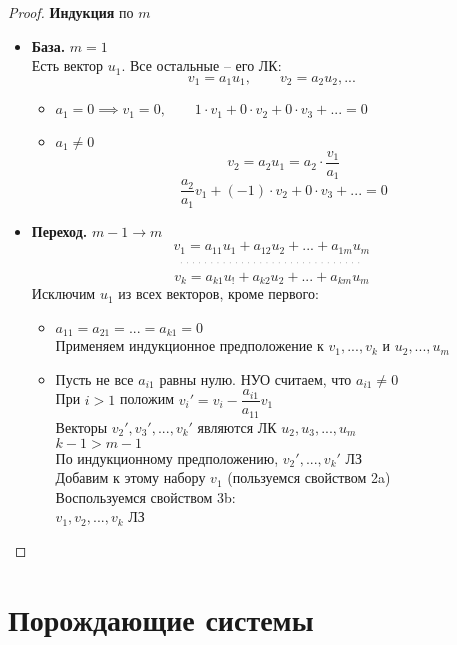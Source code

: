 \begin{proof}
    \textbf{Индукция} по $m$
    \begin{itemize}
        \item \textbf{База.} $m = 1$ \\
        Есть вектор $u_1$. Все остальные -- его ЛК:
        $$ v_1 = a_1u_1, \qquad v_2 = a_2u_2, ... $$
        \begin{itemize}
        	\item $a_1 = 0 \implies v_1 = 0, \qquad 1 \cdot v_1 + 0 \cdot v_2 + 0 \cdot v_3 + ... = 0 $
            \item $a_1 \ne 0 $
            $$ v_2 = a_2u_1 = a_2 \cdot \frac{v_1}{a_1} $$
            $$ \frac{a_2}{a_1} v_1 + (-1) \cdot v_2 + 0 \cdot v_3 + ... = 0 $$
        \end{itemize}
        \item \textbf{Переход.} $ m - 1 \to m $
        $$ v_1 = a_{11}u_1 + a_{12}u_2 + ... + a_{1m}u_m $$
        $$ \widedots $$
        $$ v_k = a_{k1}u_! + a_{k2}u_2 + ... + a_{km}u_m $$
        Исключим $u_1$ из всех векторов, кроме первого:
        \begin{itemize}
            \item $a_{11} = a_{21} = ... = a_{k1} = 0 $ \\
            Применяем индукционное предположение к $v_1, ..., v_k$ и $u_2, ..., u_m$
            \item Пусть не все $a_{i1}$ равны нулю. НУО считаем, что $a_{i1} \ne 0$ \\
            При $i > 1$ положим $v_i' = v_i - \dfrac{a_{i1}}{a_{11}}v_1 $ \\
            Векторы $v_2', v_3', ..., v_k'$ являются ЛК $u_2, u_3, ..., u_m$ \\
            $ k - 1 > m - 1 $ \\
            По индукционному предположению, $v_2', ..., v_k'$ ЛЗ \\
            Добавим к этому набору $v_1$ (пользуемся свойством 2a) \\
            Воспользуемся свойством 3b: \\
            $ v_1, v_2, ..., v_k $ ЛЗ
        \end{itemize}
    \end{itemize}
\end{proof}

\section{Порождающие системы}

